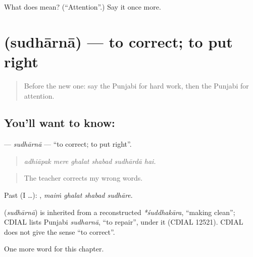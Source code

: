 \begin{tcolorbox}[breakable,colback=teal!4,colframe=teal!35!black,title={Before you move on}]
What does  mean? (\textquotedblleft{}Attention\textquotedblright{}.) Say it once more.
\end{tcolorbox}
\section[\texorpdfstring{\pa{ਸੁਧਾਰਨਾ} (sudhārnā)}{ਸੁਧਾਰਨਾ (sudhārnā)}]{ (sudhārnā) — to correct; to put right}

\label{lesson:PA-C359-sudhaarna}



\begin{quote}
Before the new one: say the Punjabi for hard work, then the Punjabi for attention.
\end{quote}

\subsection*{You'll want to know: }
\textbf{} — \emph{sudhārnā} — \textquotedblleft{}to correct; to put right\textquotedblright{}.

\begin{quote}
     
\end{quote}

\begin{quote}
\emph{adhiāpak mere ghalat shabad sudhārdā hai.}
\end{quote}

\begin{quote}
The teacher corrects my wrong words.
\end{quote}

Past (I …):    , \emph{maiṁ ghalat shabad sudhāre}.

\begin{cousinweb}
\textbf{} (\emph{sudhārnā}) is inherited from a reconstructed \emph{*śuddhakāra}, \textquotedblleft{}making clean\textquotedblright{}; CDIAL lists Punjabi \emph{sudharnā}, \textquotedblleft{}to repair\textquotedblright{}, under it (CDIAL 12521). CDIAL does not give the sense \textquotedblleft{}to correct\textquotedblright{}.
\end{cousinweb}

\begin{grammarlens}[title={What you've built}]
One more word for this chapter.
\end{grammarlens}

